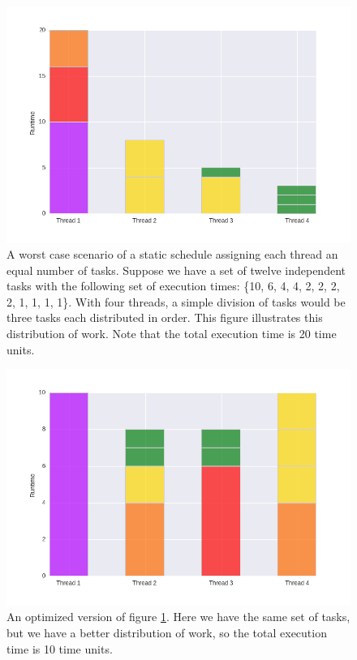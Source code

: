 \begin{figure}
	\centering
	\includegraphics[width=\textwidth]{graphics/unoptimized_schedule.png}
	\caption{A worst case scenario of a static schedule assigning each thread an equal number of tasks. Suppose we have a set of twelve independent tasks with the following set of execution times: \{10, 6, 4, 4, 2, 2, 2, 2, 1, 1, 1, 1\}. With four threads, a simple division of tasks would be three tasks each distributed in order. This figure illustrates this distribution of work. Note that the total execution time is 20 time units.}
	\label{fig:unoptimized_schedule}
\end{figure}

\begin{figure}
	\centering
	\includegraphics[width=\textwidth]{graphics/optimized_schedule.png}
	\caption{An optimized version of figure \ref{fig:unoptimized_schedule}. Here we have the same set of tasks, but we have a better distribution of work, so the total execution time is 10 time units.}
	\label{fig:optimized_schedule}
\end{figure}




